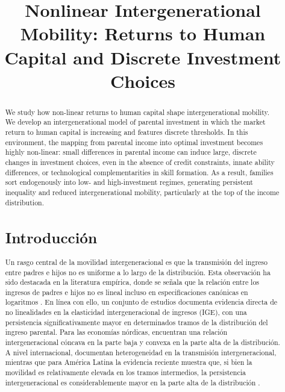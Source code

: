 \documentclass[12pt]{article}
\begin{document}
\title{Nonlinear Intergenerational Mobility: Returns to Human Capital and Discrete Investment Choices}
\maketitle 

\begin{abstract}
We study how non-linear returns to human capital shape intergenerational mobility. We develop an intergenerational model of parental investment in which the market return to human capital is increasing and features discrete thresholds. In this environment, the mapping from parental income into optimal investment becomes highly non-linear: small differences in parental income can induce large, discrete changes in investment choices, even in the absence of credit constraints, innate ability differences, or technological complementarities in skill formation. As a result, families sort endogenously into low- and high-investment regimes, generating persistent inequality and reduced intergenerational mobility, particularly at the top of the income distribution. 
\section{Introducción}

Un rasgo central de la movilidad intergeneracional es que la transmisión del ingreso entre padres e hijos no es uniforme a lo largo de la distribución. Esta observación ha sido destacada en la literatura empírica, donde se señala que la relación entre los ingresos de padres e hijos no es lineal incluso en especificaciones canónicas en logaritmos \parencite{Chetty_2014}. En línea con ello, un conjunto de estudios documenta evidencia directa de no linealidades en la elasticidad intergeneracional de ingresos (IGE), con una persistencia significativamente mayor en determinados tramos de la distribución del ingreso parental. Para las economías nórdicas, \textcite{Bratsberg_2007} encuentran una relación intergeneracional cóncava en la parte baja y convexa en la parte alta de la distribución. A nivel internacional, \textcite{Berritela_2016} documentan heterogeneidad en la transmisión intergeneracional, mientras que para América Latina la evidencia reciente muestra que, si bien la movilidad es relativamente elevada en los tramos intermedios, la persistencia intergeneracional es considerablemente mayor en la parte alta de la distribución \parencite{Leites_2022,Cortes_2024,Britto_2022}.


\end{abstract}
\end{document}
